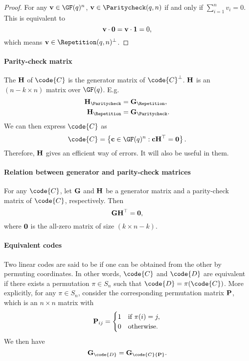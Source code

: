 \documentclass[a4paper, 11pt, openany]{book}
\begin{document}
\begin{proof}
For any ${\bf v} \in \GF(q)^n$, ${\bf v} \in \Paritycheck(q,n)$ if and only if $\sum_{i=1}^n v_i = 0$. This is equivalent to
\[
    {\bf v} \cdot {\bf 0} = {\bf v} \cdot {\bf 1} = 0,
\]
which means ${\bf v} \in \Repetition(q,n)^\perp$.
\end{proof}

\paragraph{Parity-check matrix}
The  ${\bf H}$ of $\code{C}$ is the generator matrix of $\code{C}^\perp$. ${\bf H}$ is an $(n-k \times n)$ matrix over $\GF(q)$. E.g.
\begin{align*}
	{\bf H}_{\Paritycheck} &= {\bf G}_{\Repetition},\\
	{\bf H}_{\Repetition} &= {\bf G}_{\Paritycheck}.
\end{align*}
We can then express $\code{C}$ as
\[
	\code{C} = \left\{{\bf c} \in \GF(q)^n: {\bf c}{\bf H}^\top = {\bf 0} \right\}.
\]
Therefore, ${\bf H}$ gives an efficient way of  errors. It will also be useful in  them.


\paragraph{Relation between generator and parity-check matrices}
\begin{theorem}
For any $\code{C}$, let ${\bf G}$ and ${\bf H}$ be a generator matrix and a parity-check matrix of $\code{C}$, respectively. Then
\[
	{\bf G}{\bf H}^\top = {\bf 0},
\]
where ${\bf 0}$ is the all-zero matrix of size $(k \times n-k)$.
\end{theorem}


\paragraph{Equivalent codes}
Two linear codes are said to be  if one can be obtained from the other by permuting coordinates. In other words, $\code{C}$ and $\code{D}$ are equivalent if there exists a permutation $\pi \in S_n$ such that $\code{D} = \pi(\code{C})$. More explicitly, for any $\pi \in S_n$, consider the corresponding permutation matrix ${\bf P}$, which is an $n \times n$ matrix with
\[
	{\bf P}_{ij} = \begin{cases}
	1 &\text{if } \pi(i) = j,\\
	0 &\text{otherwise.}
	\end{cases}
\]
We then have
\[
	{\bf G}_\code{D} = {\bf G}_\code{C} {\bf P}.
\]
\end{document}

